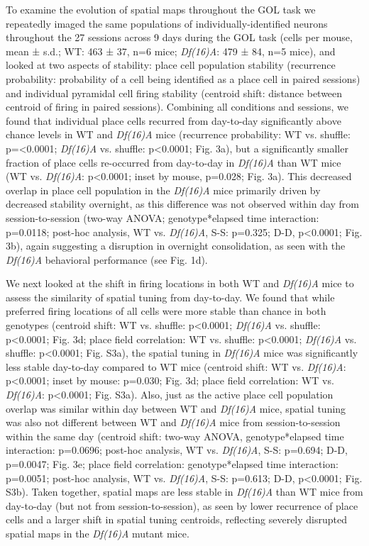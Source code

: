 To examine the evolution of spatial maps throughout the GOL task we repeatedly imaged the same populations of individually-identified neurons throughout the 27 sessions across 9 days during the GOL task (cells per mouse, mean ± s.d.; WT: 463 ± 37, n=6 mice; \emph{Df(16)A\super{+/-}}: 479 ± 84, n=5 mice), and looked at two aspects of stability: place cell population stability (recurrence probability: probability of a cell being identified as a place cell in paired sessions) and individual pyramidal cell firing stability (centroid shift: distance between centroid of firing in paired sessions). Combining all conditions and sessions, we found that individual place cells recurred \citep{Ziv2013} from day-to-day significantly above chance levels in WT and \emph{Df(16)A\super{+/-}} mice (recurrence probability: WT vs. shuffle: p=<0.0001; \emph{Df(16)A\super{+/-}} vs. shuffle: p<0.0001; Fig. 3a), but a significantly smaller fraction of place cells re-occurred from day-to-day in \emph{Df(16)A\super{+/-}} than WT mice (WT vs. \emph{Df(16)A\super{+/-}}: p<0.0001; inset by mouse, p=0.028; Fig. 3a). This decreased overlap in place cell population in the \emph{Df(16)A\super{+/-}} mice primarily driven by decreased stability overnight, as this difference was not observed within day from session-to-session (two-way ANOVA; genotype*elapsed time interaction: p=0.0118; post-hoc analysis, WT vs. \emph{Df(16)A\super{+/-}}, S-S: p=0.325; D-D, p<0.0001; Fig. 3b), again suggesting a disruption in overnight consolidation, as seen with the \emph{Df(16)A\super{+/-}} behavioral performance (see Fig. 1d).

We next looked at the shift in firing locations in both WT and \emph{Df(16)A\super{+/-}} mice to assess the similarity of spatial tuning from day-to-day. We found that while preferred firing locations of all cells were more stable than chance in both genotypes (centroid shift: WT vs. shuffle: p<0.0001; \emph{Df(16)A\super{+/-}} vs. shuffle: p<0.0001; Fig. 3d; place field correlation: WT vs. shuffle: p<0.0001; \emph{Df(16)A\super{+/-}} vs. shuffle: p<0.0001; Fig. S3a), the spatial tuning in \emph{Df(16)A\super{+/-}} mice was significantly less stable day-to-day compared to WT mice (centroid shift: WT vs. \emph{Df(16)A\super{+/-}}: p<0.0001; inset by mouse: p=0.030; Fig. 3d; place field correlation: WT vs. \emph{Df(16)A\super{+/-}}: p<0.0001; Fig. S3a). Also, just as the active place cell population overlap was similar within day between WT and \emph{Df(16)A\super{+/-}} mice, spatial tuning was also not different between WT and \emph{Df(16)A\super{+/-}} mice from session-to-session within the same day (centroid shift: two-way ANOVA, genotype*elapsed time interaction: p=0.0696; post-hoc analysis, WT vs. \emph{Df(16)A\super{+/-}}, S-S: p=0.694; D-D, p=0.0047; Fig. 3e; place field correlation: genotype*elapsed time interaction: p=0.0051; post-hoc analysis, WT vs. \emph{Df(16)A\super{+/-}}, S-S: p=0.613; D-D, p<0.0001; Fig. S3b). Taken together, spatial maps are less stable in \emph{Df(16)A\super{+/-}} than WT mice from day-to-day (but not from session-to-session), as seen by lower recurrence of place cells and a larger shift in spatial tuning centroids, reflecting severely disrupted spatial maps in the \emph{Df(16)A\super{+/-}} mutant mice.

